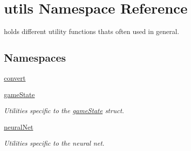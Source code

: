 \hypertarget{namespaceutils}{}\section{utils Namespace Reference}
\label{namespaceutils}


holds different utility functions that\textquotesingle{}s often used in general.  


\subsection*{Namespaces}
\begin{DoxyCompactItemize}
\item 
 \hyperlink{namespaceutils_1_1convert}{convert}
\item 
 \hyperlink{namespaceutils_1_1gameState}{game\+State}
\begin{DoxyCompactList}\small\item\em Utilities specific to the \hyperlink{namespaceutils_1_1gameState}{game\+State} struct. \end{DoxyCompactList}\item 
 \hyperlink{namespaceutils_1_1neuralNet}{neural\+Net}
\begin{DoxyCompactList}\small\item\em Utilities specific to the neural net. \end{DoxyCompactList}\end{DoxyCompactItemize}
